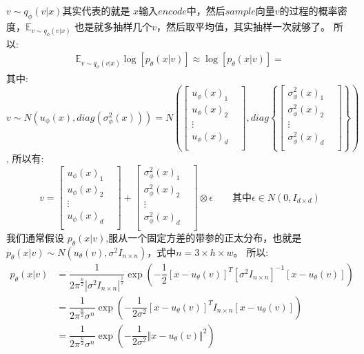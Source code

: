 \documentclass[withoutpreface,bwprint]{cumcmthesis} %
\begin{document}
	$v \sim q_{\phi}(v|x) $其实代表的就是 $x$输入$encode$中，然后$sample$向量$v$的过程的概率密度，$\mathbb{E}_{ v \sim q_{\phi}(v|x) }$ 也是就多抽样几个$v$，然后取平均值，其实抽样一次就够了。
	所以:
	\begin{align*}
		 \mathbb{E}_{ v \sim q_{\phi}(v|x)} \log \left[ p_{\theta}(x|v) \right] \approx \log \left[ p_{\theta}(x|v) \right]=
	\end{align*}
	其中:
	$$
		v \sim N(u_{\phi}(x),diag(\sigma^2_{\phi}(x))) = N \left(   		\left [ \begin{matrix}
			u_{\phi}(x)_1&  \\
			u_{\phi}(x)_2&  \\
			\vdots & \\
			u_{\phi}(x)_d & \\
		\end{matrix} \right ] 
		,
		diag  \left\{ \left [ \begin{matrix}
				\sigma^2_{\phi}(x)_1&  \\
				\sigma^2_{\phi}(x)_2&  \\
				\vdots & \\
				\sigma^2_{\phi}(x)_d & \\
			\end{matrix} \right ] \right\}
	  \right)
	$$,
	所以有:
	$$
		v= 	\left [ \begin{matrix}
			u_{\phi}(x)_1&  \\
			u_{\phi}(x)_2&  \\
			\vdots & \\
			u_{\phi}(x)_d & \\
		\end{matrix} \right ] 
			+ 		
	 \left [ \begin{matrix}
		\sigma^2_{\phi}(x)_1&  \\
		\sigma^2_{\phi}(x)_2&  \\
		\vdots & \\
		\sigma^2_{\phi}(x)_d & \\
	\end{matrix} \right ]  \otimes \epsilon   \quad \quad \text{其中} \epsilon \in N(0,I_{d\times d})
	$$
	我们通常假设 $ p_{\theta}(x|v)$,服从一个固定方差的带参的正太分布，也就是$p_{\theta}(x|v) \sim N(u_{\theta}(v),\sigma^2 I_{n \times n})$，式中$n=3\times h \times w$。
	所以:
		\begin{align*}
		p_{\theta}(x|v) & = \dfrac{1}{{2\pi}^\frac{n}{2} |\sigma^2 I_{n \times n}|^{\frac{1}{2}}} \exp\left( -\dfrac{1}{2} \left[x-u_{\theta}(v)\right]^T \left[\sigma^2 I_{n \times n} \right]^{-1} \left[ x-u_{\theta}(v)  \right]  \right) \\
		& = \dfrac{1}{{2\pi}^\frac{n}{2} \sigma^n }\exp\left( -\dfrac{1}{2  \sigma^2} \left[x-u_{\theta}(v)\right]^T I_{n \times n} \left[ x-u_{\theta}(v)  \right]  \right) \\
		& = \dfrac{1}{{2\pi}^\frac{n}{2} \sigma^n }\exp\left( -\dfrac{1}{2  \sigma^2} \Vert x-u_{\theta}(v)  \Vert^2 \right) \\
		\end{align*}
\end{document}
